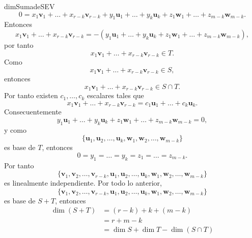 \begin{theorem}{}{dimSumadeSEV}
    $$0 = x_1 \mathbf{v}_1 + \dots + x_{r-k} \mathbf{v}_{r-k} + y_1 \mathbf{u}_1 + \dots + y_k \mathbf{u}_k + z_1 \mathbf{w}_1 + \dots + z_{m-k} \mathbf{w}_{m-k}.$$
    Entonces
    $$x_1 \mathbf{v}_1 + \dots + x_{r-k} \mathbf{v}_{r-k} = -(y_1 \mathbf{u}_1 + \dots + y_k \mathbf{u}_k + z_1 \mathbf{w}_1 + \dots + z_{m-k} \mathbf{w}_{m-k}),$$
    por tanto
    $$x_1 \mathbf{v}_1 + \dots + x_{r-k} \mathbf{v}_{r-k} \in T.$$
    Como
    $$x_1 \mathbf{v}_1 + \dots + x_{r-k} \mathbf{v}_{r-k} \in S,$$
    entonces
    $$x_1 \mathbf{v}_1 + \dots + x_{r-k} \mathbf{v}_{r-k} \in S \cap T.$$
    Por tanto existen $c_1, \dots, c_k$ escalares tales que
    $$x_1 \mathbf{v}_1 + \dots + x_{r-k} \mathbf{v}_{r-k} = c_1 \mathbf{u}_1 + \dots + c_k \mathbf{u}_k.$$
    Consecuentemente
    $$y_1 \mathbf{u}_1 + \dots + y_k \mathbf{u}_k + z_1 \mathbf{w}_1 + \dots + z_{m-k} \mathbf{w}_{m-k} = 0,$$
    \newpage
    y como
    $$\{\mathbf{u}_1, \mathbf{u}_2, \dots, \mathbf{u}_k, \mathbf{w}_1, \mathbf{w}_2, \dots, \mathbf{w}_{m-k}\}$$
    es base de $T$, entonces
    $$0 = y_1 = \dots = y_k = z_1 = \dots = z_{m-k}.$$
    Por tanto
    $$\{\mathbf{v}_1, \mathbf{v}_2, \dots, \mathbf{v}_{r-k}, \mathbf{u}_1, \mathbf{u}_2, \dots, \mathbf{u}_k, \mathbf{w}_1, \mathbf{w}_2, \dots, \mathbf{w}_{m-k}\}$$
    es linealmente independiente. Por todo lo anterior,
    $$\{\mathbf{v}_1, \mathbf{v}_2, \dots, \mathbf{v}_{r-k}, \mathbf{u}_1, \mathbf{u}_2, \dots, \mathbf{u}_k, \mathbf{w}_1, \mathbf{w}_2, \dots, \mathbf{w}_{m-k}\}$$
    es base de $S + T$, entonces
    \begin{align*}
        \dim(S + T) & = (r - k) + k + (m - k) \\
        & = r + m - k \\
        & = \dim S + \dim T - \dim(S \cap T)
    \end{align*}
\end{theorem}

